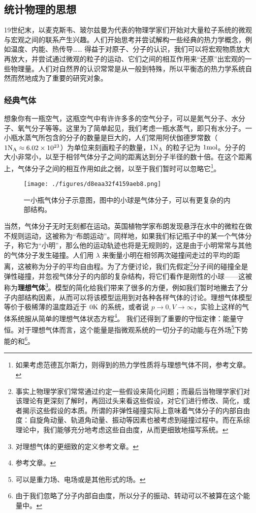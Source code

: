 \subsection{统计物理的思想}
19世纪末，以麦克斯韦、玻尔兹曼为代表的物理学家们开始对大量粒子系统的微观与宏观之间的联系产生兴趣。人们开始思考并尝试解构一些经典的热力学概念，例如温度、内能、热传导…… 得益于对原子、分子的认识，我们可以将宏观物质放大再放大，并尝试通过微观的粒子的运动、它们之间的相互作用来“还原”出宏观的一些物理量。人们对自然界的认识常常是从一般到特殊，所以平衡态的热力学系统自然而然地成为了重要的研究对象。
\subsubsection{经典气体}
想象你有一瓶空气，这瓶空气中有许许多多的空气分子，可以是氮气分子、水分子、氧气分子等等。这里为了简单起见，我们考虑一瓶水蒸气，即只有水分子。一小瓶水蒸气所包含的分子的数量是巨大的，人们常用阿伏伽德罗常数（$1 {\rm N_A}\approx 6.02\times 10^{23}$）为单位来刻画粒子的数量，$1 {\rm N_A}$ 的粒子记为 $1 {\rm mol}$。分子的大小非常小，以至于相邻气体分子之间的距离达到分子半径的数十倍。在这个距离上，气体分子之间的相互作用如此之弱，以至于我们暂时可以忽略它\footnote{如果考虑范德瓦尔斯力，则得到的热力学性质将与理想气体不同，参考文章。}。

\begin{figure}[ht]
\centering
\texttt{[image: ./figures/d8eaa32f4159aeb8.png]}
\caption{一小瓶气体分子示意图，图中的小球是气体分子，可以有更复杂的内部结构。} \label{fig_statsc_1}
\end{figure}
当然，气体分子无时无刻都在运动。英国植物学家布朗发现悬浮在水中的微粒在做不规则运动，这被称为“布朗运动”。同样地，如果我们标记瓶子中的某一个气体分子，称它为“小明”，那么他的运动轨迹也将是无规则的，这是由于小明常常与其他的气体分子发生碰撞。人们用 $\lambda$ 来衡量小明在相邻两次碰撞间走过的平均的距离，这被称为分子的平均自由程。为了方便讨论，我们先假定\footnote{事实上物理学家们常常通过约定一些假设来简化问题；而最后当物理学家们对该理论有更深刻了解时，再回过头来看这些假设，对它们进行修改、简化，或者揭示这些假设的本质。所谓的非弹性碰撞实际上意味着气体分子的内部自由度：自旋角动量、轨道角动量、振动等因素也被考虑到碰撞过程中。而在系综理论中，我们能够充分地考虑这些自由度，从而更细致地描写系统。}分子间的碰撞全是弹性碰撞，并忽视气体分子的内部的复杂结构，将它们看作是刚性的小球——这被称为\textbf{理想气体}\footnote{对理想气体的更细致的定义参考文章。}。模型的简化给我们带来了很多的方便，例如我们暂时地撇去了分子内部结构因素，从而可以将该模型运用到对各种各样气体的讨论。理想气体模型等价于极稀薄的温度趋近于 $0 \rm K$ 的系统，或者说 $p\rightarrow 0,V\rightarrow \infty$，实验上这样的气体系统服从简单的理想气体状态方程\footnote{参考文章。}。
我们还得到了重要的守恒定律：能量守恒。对于理想气体而言，这个能量是指微观系统的一切分子的动能与在外场\footnote{可以是重力场、电场或是其他形式的场。}下势能的和\footnote{由于我们忽略了分子内部自由度，所以分子的振动、转动可以不被算在这个能量中。}。


